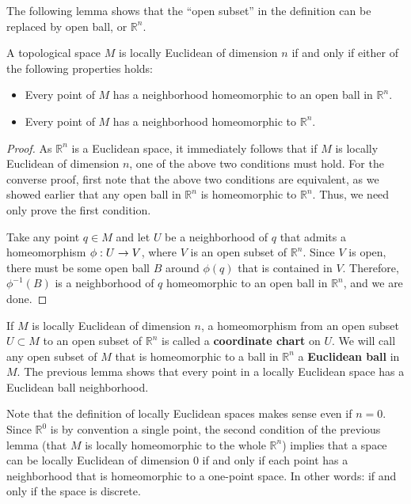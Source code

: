 \documentclass{mathnotes}
\begin{document}
The following lemma shows that the ``open subset'' in the definition can be replaced by open ball, or $\mathbb{R}^n$.

\begin{lem}
    A topological space $M$ is locally Euclidean of dimension $n$ if and only if either of the following properties holds:
    \begin{itemize}
        \item Every point of $M$ has a neighborhood homeomorphic to an open ball in $\mathbb{R}^n$.
        \item Every point of $M$ has a neighborhood homeomorphic to $\mathbb{R}^n$.
    \end{itemize}
\end{lem}

\begin{proof}
    As $\mathbb{R}^n$ is a Euclidean space, it immediately follows that if $M$ is locally Euclidean of dimension $n$, one of the
    above two conditions must hold. For the converse proof, first note that the above two conditions are equivalent, as we
    showed earlier that any open ball in $\mathbb{R}^n$ is homeomorphic to $\mathbb{R}^n$. Thus, we need only prove the first
    condition.

    Take any point $q\in M$ and let $U$ be a neighborhood of $q$ that admits a homeomorphism $\phi: U\rightarrow V$, where $V$ is an open
    subset of $\mathbb{R}^n$. Since $V$ is open, there must be some open ball $B$ around $\phi(q)$ that is contained in $V$.
    Therefore, $\phi^{-1}(B)$ is a neighborhood of $q$ homeomorphic to an open ball in $\mathbb{R}^n$, and we are done.
\end{proof}

\begin{defn}
    If $M$ is locally Euclidean of dimension $n$, a homeomorphism from an open subset $U\subset M$ to an open subset of $\mathbb{R}^n$
    is called a \textbf{coordinate chart} on $U$. We will call any open subset of $M$ that is homeomorphic to a ball in $\mathbb{R}^n$
    a \textbf{Euclidean ball} in $M$. The previous lemma shows that every point in a locally Euclidean space has a Euclidean ball
    neighborhood.
\end{defn}

Note that the definition of locally Euclidean spaces makes sense even if $n=0$. Since $\mathbb{R}^0$ is by convention a single point,
the second condition of the previous lemma (that $M$ is locally homeomorphic to the whole $\mathbb{R}^n$) implies that a space
can be locally Euclidean of dimension 0 if and only if each point has a neighborhood that is homeomorphic to a one-point space. In
other words: if and only if the space is discrete.
\end{document}
